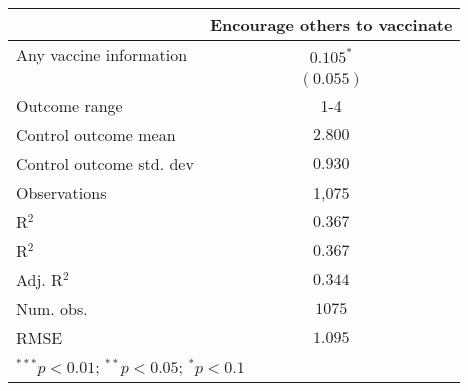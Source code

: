 
\begin{table}
\begin{center}
\begin{tabular}{l c}
\hline
 & Encourage others to vaccinate \\
\hline
Any vaccine information  & $0.105^{*}$ \\
                         & $(0.055)$   \\
\hline
Outcome range            & 1-4         \\
Control outcome mean     & $2.800$     \\
Control outcome std. dev & $0.930$     \\
Observations             & 1,075       \\
R$^{2}$                  & $0.367$     \\
R$^2$                    & $0.367$     \\
Adj. R$^2$               & $0.344$     \\
Num. obs.                & $1075$      \\
RMSE                     & $1.095$     \\
\hline
\multicolumn{2}{l}{\scriptsize{$^{***}p<0.01$; $^{**}p<0.05$; $^{*}p<0.1$}}
\end{tabular}
\caption{}
\label{table:Tables and Figures/SI_table21_anyinfo_Mexico_encourage1-4}
\end{center}
\end{table}
